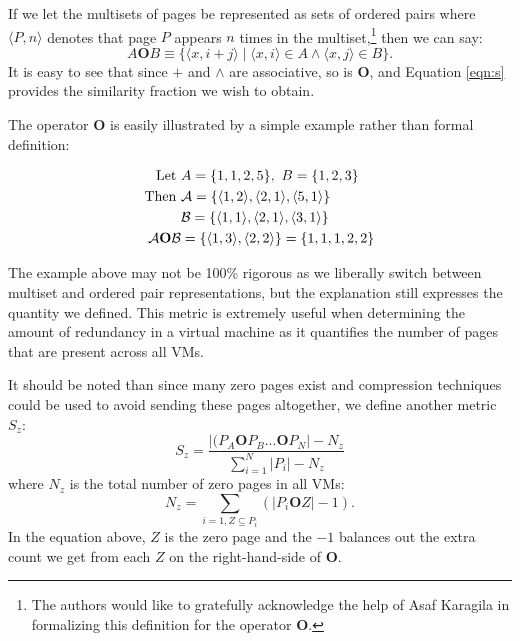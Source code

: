 \documentclass{acm_proc_article-sp}
\newcommand{\tup}[1]{\langle #1\rangle}
\begin{document}
If we let the multisets of pages be represented as sets of ordered pairs where $\tup{P,n}$ denotes that page $P$ appears $n$ times in the multiset,\footnote{The authors would like to gratefully acknowledge the help of Asaf Karagila in formalizing this definition for the operator $\mathbf{O}$.}
then we can say:
\begin{equation}\label{eqn:s}
A\mathrel{\mathbf{O}}B\equiv\{\tup{x,i+j}\mid\tup{x,i}\in A\land\tup{x,j}\in B\}.
\end{equation}
It is easy to see that since $+$ and $\land$ are associative, so is $\mathbf{O}$, and Equation \ref{eqn:s} provides the similarity fraction we wish to obtain.

The operator $\mathbf{O}$ is easily illustrated by a simple example rather than formal definition:

\begin{align*}
\textrm{Let } & A = \{1,1,2,5\},~B = \{1,2,3\}\\
\textrm{Then } &{\cal A} = \{\tup{1,2}, \tup{2,1}, \tup{5,1}\}\\
& {\cal B} = \{\tup{1,1}, \tup{2,1}, \tup{3,1}\}\\
{\cal A} \mathbf{O} {\cal B} &= \{\tup{1,3}, \tup{2,2}\} = \{1,1,1,2,2\}
\end{align*}

The example above may not be 100\% rigorous as we liberally switch between multiset and ordered pair representations, but the explanation still expresses the quantity we defined.  This metric is extremely useful when determining the amount of redundancy in a virtual machine as it quantifies the number of pages that are present across all VMs.

It should be noted than since many zero pages exist and compression techniques could be used to avoid sending these pages altogether\cite{live_adaptive_compress}, we define another metric $S_z$:
\begin{equation}
S_z = \frac{|(P_A \mathbf{O} P_B ... \mathbf{O} P_N|-N_z}{\sum\limits_{i=1}^{N}|P_i|-N_z}
\end{equation}
where $N_z$ is the total number of zero pages in all VMs:
\begin{equation}
N_z = \sum\limits_{i=1,Z\subseteq P_i}\left(|P_i\mathbf{O}Z|-1\right).
\end{equation}\label{eqn:sz}
In the equation above, $Z$ is the zero page and the $-1$ balances out the extra count we get from each $Z$ on the right-hand-side of $\mathbf{O}$.
\end{document}
